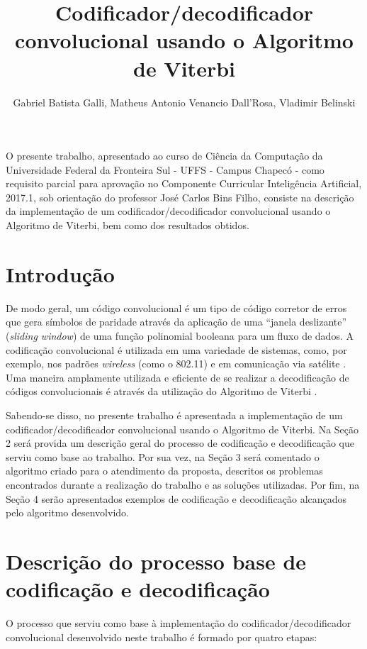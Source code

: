 \documentclass[12pt]{article}
\title{Codificador/decodificador convolucional usando o Algoritmo de Viterbi}
\author{Gabriel Batista Galli\inst{1}, Matheus Antonio Venancio Dall'Rosa\inst{1}, Vladimir Belinski\inst{1}}
\begin{document}
 

\maketitle
     
\begin{resumo} 
  O presente trabalho, apresentado ao curso de Ciência da Computação da Universidade Federal da Fronteira Sul - UFFS - Campus Chapecó - como requisito parcial para aprovação no Componente Curricular Inteligência Artificial, 2017.1, sob orientação do professor José Carlos Bins Filho, consiste na descrição da implementação de um codificador/decodificador convolucional usando o Algoritmo de Viterbi, bem como dos resultados obtidos.
\end{resumo}

\section{Introdução}

De modo geral, um código convolucional é um tipo de código corretor de erros que gera símbolos de paridade através da aplicação de uma ``janela deslizante'' (\textit{sliding window}) de uma função polinomial booleana para um fluxo de dados. A codificação convolucional é utilizada em uma variedade de sistemas, como, por exemplo, nos padrões \textit{wireless} (como o 802.11) e em comunicação via satélite \cite{MIT:2010}. Uma maneira amplamente utilizada e eficiente de se realizar a decodificação de códigos convolucionais é através da utilização do Algoritmo de Viterbi \cite{MIT:2010}.

Sabendo-se disso, no presente trabalho é apresentada a implementação de um codificador/decodificador convolucional usando o Algoritmo de Viterbi. Na Seção 2 será provida um descrição geral do processo de codificação e decodificação que serviu como base ao trabalho. Por sua vez, na Seção 3 será comentado o algoritmo criado para o atendimento da proposta, descritos os problemas encontrados durante a realização do trabalho e as soluções utilizadas. Por fim, na Seção 4 serão apresentados exemplos de codificação e decodificação alcançados pelo algoritmo desenvolvido.

\section{Descrição do processo base de codificação e decodificação}

O processo que serviu como base à implementação do codificador/decodificador convolucional desenvolvido neste trabalho é formado por quatro etapas:
\end{document}
